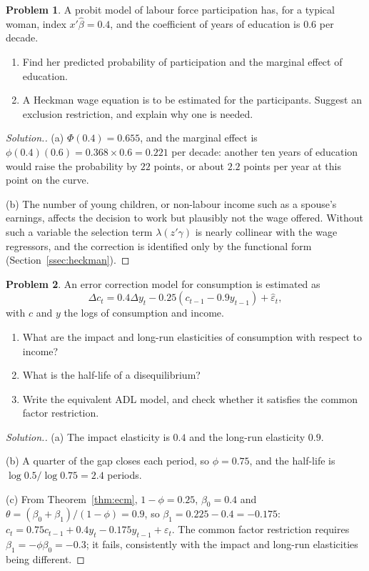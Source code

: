 \documentclass[11pt,a4paper]{article}
\numberwithin{equation}{section}
\theoremstyle{definition}
\newtheorem{problemx}{Problem}[subsection]
\newenvironment{problem}{\begin{problemx}}{\end{problemx}}
\newenvironment{solution}
  {\renewcommand{\qedsymbol}{}\begin{proof}[\textit{Solution}.]}
  {\end{proof}}
\begin{document}
\begin{problem}
A probit model of labour force participation has, for a typical woman, index $x'\hat\beta = 0.4$, and the coefficient of years of education is $0.6$ per decade.
\begin{enumerate}[label=(\alph*)]
\item Find her predicted probability of participation and the marginal effect of education.
\item A Heckman wage equation is to be estimated for the participants. Suggest an exclusion restriction, and explain why one is needed.
\end{enumerate}
\end{problem}

\begin{solution}
(a) $\Phi(0.4) = 0.655$, and the marginal effect is $\phi(0.4)(0.6) = 0.368 \times 0.6 = 0.221$ per decade: another ten years of education would raise the probability by $22$ points, or
about $2.2$ points per year at this point on the curve.

(b) The number of young children, or non-labour income such as a spouse's earnings, affects the decision to work but plausibly not the wage offered.
Without such a variable the selection term $\lambda(z'\gamma)$ is nearly collinear with the wage regressors, and the correction is identified only by the
functional form (Section~\ref{ssec:heckman}).
\end{solution}

\begin{problem}
An error correction model for consumption is estimated as
\[
\Delta c_t = 0.4\Delta y_t - 0.25(c_{t-1} - 0.9y_{t-1}) + \hat\varepsilon_t ,
\]
with $c$ and $y$ the logs of consumption and income.
\begin{enumerate}[label=(\alph*)]
\item What are the impact and long-run elasticities of consumption with respect to income?
\item What is the half-life of a disequilibrium?
\item Write the equivalent ADL model, and check whether it satisfies the common factor restriction.
\end{enumerate}
\end{problem}

\begin{solution}
(a) The impact elasticity is $0.4$ and the long-run elasticity $0.9$.

(b) A quarter of the gap closes each period, so $\phi = 0.75$, and the half-life is $\log 0.5/\log 0.75 = 2.4$ periods.

(c) From Theorem~\ref{thm:ecm}, $1 - \phi = 0.25$, $\beta_0 = 0.4$ and $\theta = (\beta_0 + \beta_1)/(1 - \phi) = 0.9$, so $\beta_1 = 0.225 - 0.4 = -0.175$:
$c_t = 0.75c_{t-1} + 0.4y_t - 0.175y_{t-1} + \varepsilon_t$. The common factor restriction requires $\beta_1 = -\phi\beta_0 = -0.3$; it fails, consistently with the impact and long-run
elasticities being different.
\end{solution}
\end{document}

